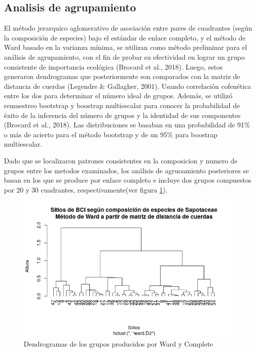 \documentclass[11pt,]{article}
\begin{document}
\subsection{Analisis de agrupamiento}\label{analisis-de-agrupamiento}

El método jerarquico aglomerativo de asociación entre pares de
cuadrantes (según la composición de especies) bajo el estándar de enlace
completo, y el método de Ward basado en la varianza mínima, se utilizan
como método preliminar para el análisis de agrupamiento, con el fin de
probar su efectividad en lograr un grupo consistente de importancia
ecológica (Brocard et al., 2018). Luego, estos generaron dendrogramas
que posteriormente son comparados con la matriz de distancia de cuerdas
(Legendre \& Gallagher, 2001). Usando correlación cofenética entre los
dos para determinar el número ideal de grupos. Además, se utilizó
remuestreo bootstrap y boostrap multiescalar para conocer la
probabilidad de éxito de la inferencia del número de grupos y la
identidad de sus componentes (Brocard et al., 2018). Las distribuciones
se basaban en una probabilidad de 91\% o más de acierto para el método
bootstrap y de un 95\% para boostrap multiescalar.

Dado que se localizaron patrones consistentes en la composicion y numero
de grupos entre los metodos examinados, los análisis de agruoamiento
posteriores se basan en los que se produce por enlace completo e incluye
dos grupos compuestos por 20 y 30 cuadrantes, respectivamente(ver figura
\ref{fig:Dendograma}).

\begin{figure}
\centering
\includegraphics[width=1.00000\textwidth]{Dendograma.png}
\caption{Dendrogramas de los grupos producidos por Ward y Complete
\label{fig:Dendograma}}
\end{figure}
\end{document}
